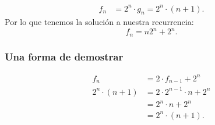 \begin{align*}
f_n&=2^n\cdot g_n=2^n\cdot (n+1).
\end{align*}
Por lo que tenemos la solución a nuestra recurrencia:
$$f_n=n2^n+2^n.$$

\subsubsection{Una forma de demostrar}
\begin{align*}
f_n&=2\cdot f_{n-1}+2^n\\
2^n\cdot (n+1)&=2\cdot 2^{n-1}\cdot n + 2^n\\
&=2^n\cdot n + 2^n\\
&=2^n\cdot (n+1).
\end{align*}